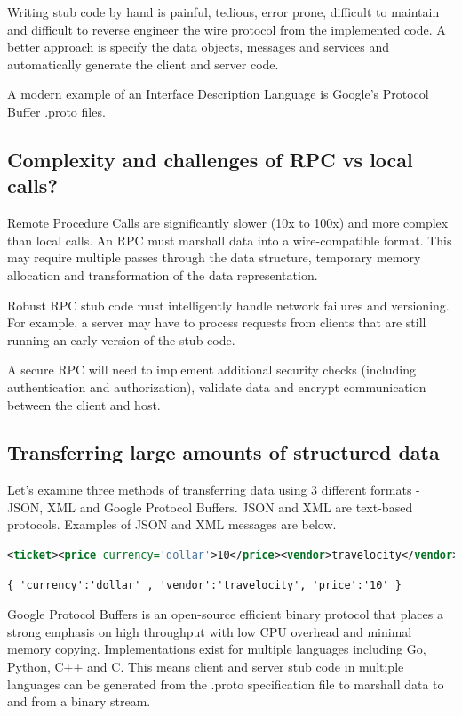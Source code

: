 Writing stub code by hand is painful, tedious, error prone, difficult to maintain and difficult to reverse engineer the wire protocol from the implemented code. A better approach is specify the data objects, messages and services and automatically generate the client and server code.

A modern example of an Interface Description Language is Google's Protocol Buffer .proto files.

\subsection{Complexity and challenges of RPC vs local calls?}

Remote Procedure Calls are significantly slower (10x to 100x) and more complex than local calls. An RPC must marshall data into a wire-compatible format. This may require multiple passes through the data structure, temporary memory allocation and transformation of the data representation.

Robust RPC stub code must intelligently handle network failures and versioning. For example, a server may have to process requests from clients that are still running an early version of the stub code.

A secure RPC will need to implement additional security checks (including authentication and authorization), validate data and encrypt communication between the client and host.

\subsection{Transferring large amounts of structured data}

Let's examine three methods of transferring data using 3 different formats - JSON, XML and Google Protocol Buffers. JSON and XML are text-based protocols. Examples of JSON and XML messages are below.

\begin{lstlisting}[language=XML]
<ticket><price currency='dollar'>10</price><vendor>travelocity</vendor></ticket>
\end{lstlisting}

\begin{lstlisting}
{ 'currency':'dollar' , 'vendor':'travelocity', 'price':'10' }
\end{lstlisting}

Google Protocol Buffers is an open-source efficient binary protocol that places a strong emphasis on high throughput with low CPU overhead and minimal memory copying. Implementations exist for multiple languages including Go, Python, C++ and C. This means client and server stub code in multiple languages can be generated from the .proto specification file to marshall data to and from a binary stream.

